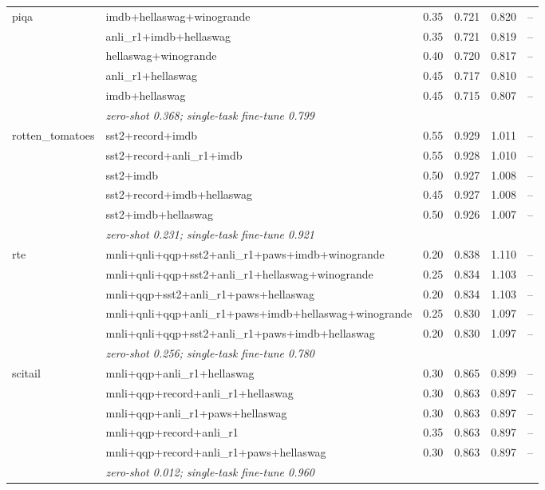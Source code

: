 \begin{table}[t]
\begin{tabular}{llrrrr}
    piqa & imdb+hellaswag+winogrande & 0.35 & 0.721 & 0.820 & -- \\
     & anli\_r1+imdb+hellaswag & 0.35 & 0.721 & 0.819 & -- \\
     & hellaswag+winogrande & 0.40 & 0.720 & 0.817 & -- \\
     & anli\_r1+hellaswag & 0.45 & 0.717 & 0.810 & -- \\
     & imdb+hellaswag & 0.45 & 0.715 & 0.807 & -- \\
    & \multicolumn{5}{l}{\textit{zero-shot 0.368; single-task fine-tune 0.799}} \\
    \addlinespace
    rotten\_tomatoes & sst2+record+imdb & 0.55 & 0.929 & 1.011 & -- \\
     & sst2+record+anli\_r1+imdb & 0.55 & 0.928 & 1.010 & -- \\
     & sst2+imdb & 0.50 & 0.927 & 1.008 & -- \\
     & sst2+record+imdb+hellaswag & 0.45 & 0.927 & 1.008 & -- \\
     & sst2+imdb+hellaswag & 0.50 & 0.926 & 1.007 & -- \\
    & \multicolumn{5}{l}{\textit{zero-shot 0.231; single-task fine-tune 0.921}} \\
    \addlinespace
    rte & mnli+qnli+qqp+sst2+anli\_r1+paws+imdb+winogrande & 0.20 & 0.838 & 1.110 & -- \\
     & mnli+qnli+qqp+sst2+anli\_r1+hellaswag+winogrande & 0.25 & 0.834 & 1.103 & -- \\
     & mnli+qqp+sst2+anli\_r1+paws+hellaswag & 0.20 & 0.834 & 1.103 & -- \\
     & mnli+qnli+qqp+anli\_r1+paws+imdb+hellaswag+winogrande & 0.25 & 0.830 & 1.097 & -- \\
     & mnli+qnli+qqp+sst2+anli\_r1+paws+imdb+hellaswag & 0.20 & 0.830 & 1.097 & -- \\
    & \multicolumn{5}{l}{\textit{zero-shot 0.256; single-task fine-tune 0.780}} \\
    \addlinespace
    scitail & mnli+qqp+anli\_r1+hellaswag & 0.30 & 0.865 & 0.899 & -- \\
     & mnli+qqp+record+anli\_r1+hellaswag & 0.30 & 0.863 & 0.897 & -- \\
     & mnli+qqp+anli\_r1+paws+hellaswag & 0.30 & 0.863 & 0.897 & -- \\
     & mnli+qqp+record+anli\_r1 & 0.35 & 0.863 & 0.897 & -- \\
     & mnli+qqp+record+anli\_r1+paws+hellaswag & 0.30 & 0.863 & 0.897 & -- \\
    & \multicolumn{5}{l}{\textit{zero-shot 0.012; single-task fine-tune 0.960}} \\
    \bottomrule
  \end{tabular}
\end{table}

